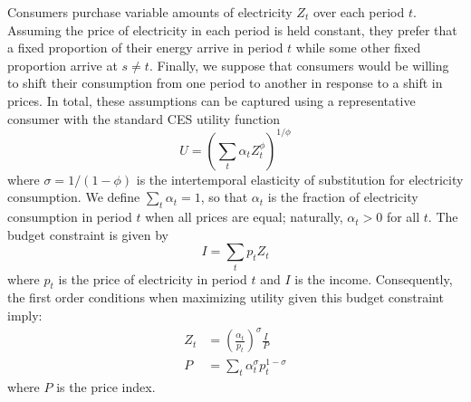 \documentclass[12pt,a4paper]{extarticle}
\begin{document}
Consumers purchase variable amounts of electricity $Z_t$ over each period $t$. Assuming the price of electricity in each period is held constant, they prefer that a fixed proportion of their energy arrive in period $t$ while some other fixed proportion arrive at $s \neq t$. Finally, we suppose that consumers would be willing to shift their consumption from one period to another in response to a shift in prices. In total, these assumptions can be captured using a representative consumer with the standard CES utility function
\begin{equation}
U = \left( \sum_t \alpha_t Z_t^\phi  \right)^{1/\phi}
\end{equation}
where $\sigma = 1/(1-\phi)$ is the intertemporal elasticity of substitution for electricity consumption. We define $\sum_t \alpha_t = 1$, so that $\alpha_t$ is the fraction of electricity consumption in period $t$ when all prices are equal; naturally, $\alpha_t > 0$ for all $t$. The budget constraint is given by
\begin{equation}
I = \sum_t p_t Z_t
\end{equation}
where $p_t$ is the price of electricity in period $t$ and $I$ is the income. Consequently, the first order conditions when maximizing utility given this budget constraint imply:
\begin{align}
Z_t &= \left(\frac{\alpha_t}{p_t} \right)^\sigma \frac{I}{P} \\
P &= \sum_t \alpha_t^\sigma p_t^{1-\sigma}
\end{align}
where $P$ is the price index. 
\end{document}
